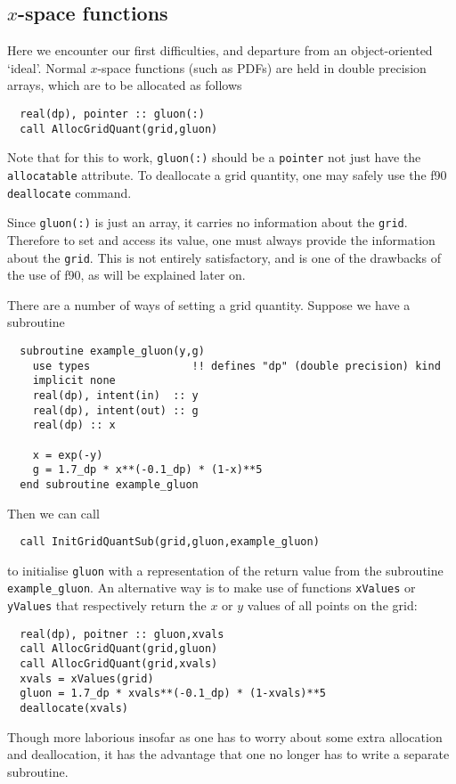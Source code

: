 \documentclass[12pt]{article}
\begin{document}
\subsection{$x$-space functions}
\label{sec:xspc}

Here we encounter our first difficulties, and departure from an
object-oriented `ideal'. Normal $x$-space functions (such as PDFs) are
held in double precision arrays, which are to be allocated as follows
\begin{verbatim}
  real(dp), pointer :: gluon(:)
  call AllocGridQuant(grid,gluon)
\end{verbatim}
Note that for this to work, \texttt{gluon(:)} should be a
\texttt{pointer} not just have the \texttt{allocatable} attribute. To
deallocate a grid quantity, one may safely use the f90
\texttt{deallocate} command.

Since \texttt{gluon(:)} is just an array, it carries no information
about the \texttt{grid}. Therefore to set and access its value, one
must always provide the information about the \texttt{grid}. This is
not entirely satisfactory, and is one of the drawbacks of the use of
f90, as will be explained later on.

There are a number of ways of setting a grid quantity. Suppose we have
a subroutine
\begin{verbatim}
  subroutine example_gluon(y,g)
    use types                !! defines "dp" (double precision) kind
    implicit none
    real(dp), intent(in)  :: y
    real(dp), intent(out) :: g
    real(dp) :: x
    
    x = exp(-y)
    g = 1.7_dp * x**(-0.1_dp) * (1-x)**5 
  end subroutine example_gluon
\end{verbatim}
Then we can call
\begin{verbatim}
  call InitGridQuantSub(grid,gluon,example_gluon)
\end{verbatim}
to initialise \texttt{gluon} with a representation of the return value
from the subroutine \texttt{example\_gluon}. An alternative way is to
make use of functions \texttt{xValues} or \texttt{yValues} that
respectively return the $x$ or $y$ values of all points on the grid:
\begin{verbatim}
  real(dp), poitner :: gluon,xvals
  call AllocGridQuant(grid,gluon)
  call AllocGridQuant(grid,xvals)
  xvals = xValues(grid)
  gluon = 1.7_dp * xvals**(-0.1_dp) * (1-xvals)**5 
  deallocate(xvals)
\end{verbatim}
Though more laborious insofar as one has to worry about some extra
allocation and deallocation, it has the advantage that one no longer
has to write a separate subroutine.
 
\end{document}
